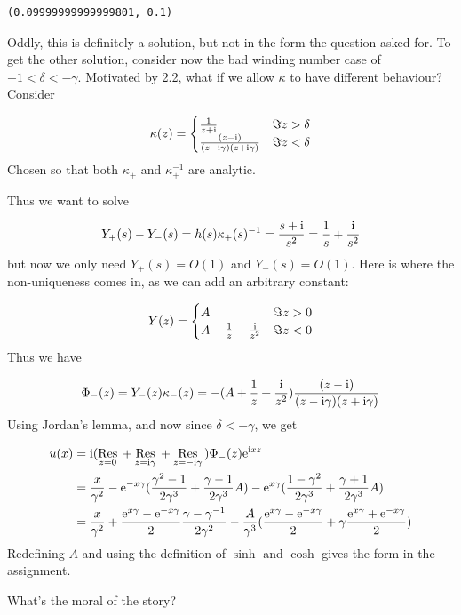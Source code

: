 \documentclass[12pt,a4paper]{article}
\def\I{ {\rm i} }
\def\E{ {\rm e} }
\def\Res_#1{\underset{#1}{\rm Res}\,}
\begin{document}
\begin{lstlisting}
(0.09999999999999801, 0.1)
\end{lstlisting}


Oddly, this is definitely a solution, but not in the form the question asked for. To get the other solution, consider now the bad winding number case of $-1 < \delta < - \gamma$. Motivated by 2.2, what if we allow $\kappa$ to have different behaviour? Consider

\[
\kappa(z) = \begin{cases}
    {1 \over z + \I} & \Im z > \delta\\
    {(z-\I)  \over (z-\I  \gamma) (z+\I  \gamma)} & \Im z < \delta 
    \end{cases}
\]
Chosen so that both $\kappa_+$ and $\kappa_+^{-1}$ are analytic. 

Thus we want to solve

\[
Y_+(s) - Y_-(s) = h(s) \kappa_+(s)^{-1} =  { s + \I \over s^2} = {1 \over s} + {\I \over s^2}
\]
but now we only need $Y_+(s) = O(1)$ and $Y_-(s) = O(1)$. Here is where the non-uniqueness comes in, as we can add an arbitrary constant:

\[
Y(z) = \begin{cases}
                      A            & \Im z > 0 \\
   A -   {1 \over z} - {\I \over z^2} & \Im z < 0
\end{cases}
\]
Thus we have

\[
\Phi_-(z) = Y_-(z) \kappa_-(z) = -(  A +    {1 \over z} +  {\I \over z^2} ){(z-\I)  \over (z-\I  \gamma) (z+\I  \gamma)} 
\]
Using Jordan's lemma, and now since $\delta < - \gamma$, we get


\begin{align*}
u(x) &= \I (\Res_{z = 0} + \Res_{z = \I \gamma} + \Res_{z = - \I \gamma})  \Phi_-(z) \E^{\I x z} \\
&= {x \over \gamma^2} - \E^{-x \gamma}( {\gamma^2-1 \over 2 \gamma^3} + {\gamma-1 \over 2\gamma^3}   A) - \E^{x \gamma} ({1-\gamma^2 \over 2 \gamma^3} + {\gamma+1 \over 2\gamma^3}   A)\\
&=  {x \over \gamma^2} + {\E^{x \gamma} - \E^{-x \gamma} \over 2} {\gamma-\gamma^{-1} \over 2 \gamma^2}  - {A \over \gamma^3} ( {\E^{x \gamma} - \E^{-x \gamma} \over 2} +  \gamma {\E^{x \gamma} + \E^{-x \gamma} \over 2} )
\end{align*}
Redefining $A$ and using the definition of $\sinh$ and $\cosh$ gives the form in the assignment.

What's the moral of the story? 
\end{document}
